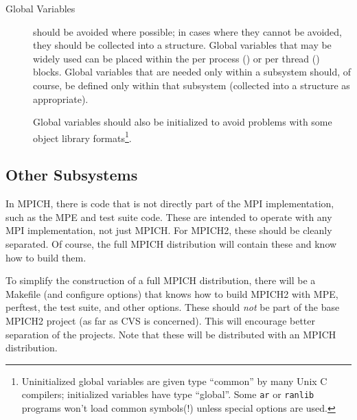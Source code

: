 \documentclass{article}
\begin{document}
\begin{description}


\item[Global Variables]should be avoided where possible; in cases
where they cannot be avoided, they should be collected into a
structure.  Global variables that may be widely used can be placed
within the per process () or per thread
() blocks.  Global variables that are needed only
within a subsystem should, of course, be defined only within that
subsystem (collected into a structure as appropriate).

Global variables should also be initialized to avoid problems with
some object library formats\footnote{Uninitialized global variables
are given type ``common'' by many Unix C compilers; initialized
variables have type ``global''.  Some \texttt{ar} or \texttt{ranlib}
programs won't load common symbols(!) unless special options are used.}.
\end{description}

\subsection{Other Subsystems}
In MPICH, there is code that is not directly part of the MPI
implementation, such as the MPE and test suite code.  These are intended to
operate with any MPI implementation, not just MPICH.
For MPICH2, these should be cleanly separated.  Of course, the full MPICH
distribution will contain these and know how to build them.

To simplify the construction of a
full MPICH distribution, there will be a Makefile (and configure
options) that knows how to build MPICH2 with MPE, perftest, the test
suite, and other options.  These should \emph{not} be part of the base
MPICH2 project (as far as CVS is concerned).  This will encourage
better separation of the projects.  Note that these will be distributed with
an MPICH distribution.  
\end{document}
